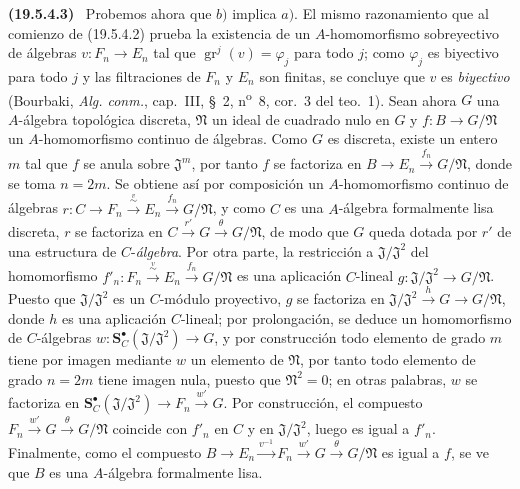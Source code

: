 \documentclass[10pt,oneside]{book}
\makeatletter
\newcommand{\gr}{\operatorname{gr}}
\newcommand{\setmanualcurrentlabel}[1]{\def\@currentlabel{#1}}
\newcommand{\oldpage}[2][]{%
  \setcounter{footnote}{0}%
  \marginpar{\scriptsize\textbf{#1}~|~#2}\ignorespaces}
\newenvironment{env}[1][]{\setmanualcurrentlabel{#1}\par\medskip\noindent\textbf{(#1)}\ }{\par}
\makeatother
\begin{document}
\begin{env}[19.5.4.3]
\label{0.19.5.4.3-es}
\oldpage[0\textsubscript{IV-1}]{93}
Probemos ahora que $b)$ implica $a)$. El mismo razonamiento que al comienzo de
(19.5.4.2) prueba la existencia de un $A$-homomorfismo sobreyectivo de álgebras
$v:F_n\to E_n$ tal que $\gr^j(v)=\varphi_j$ para todo $j$; como $\varphi_j$
es biyectivo para todo $j$ y las filtraciones de $F_n$ y $E_n$ son
finitas, se concluye que $v$ es \emph{biyectivo} (Bourbaki,
\emph{Alg. conm.}, cap.~III, §~2, n\textsuperscript{o}~8, cor.~3 del teo.~1).
Sean ahora $G$ una $A$-álgebra topológica discreta, $\mathfrak N$ un
ideal de cuadrado nulo en $G$ y $f:B\to G/\mathfrak N$ un $A$-homomorfismo
continuo de álgebras. Como $G$ es discreta, existe un entero $m$ tal que
$f$ se anula sobre $\mathfrak J^m$, por tanto $f$ se factoriza en
$B\to E_n\xrightarrow{f_n}G/\mathfrak N$, donde se toma $n=2m$. Se obtiene así por
composición un $A$-homomorfismo continuo de álgebras
$r:C\to F_n\xrightarrow{\overset{v}{\sim}}E_n\xrightarrow{f_n}G/\mathfrak N$, y como $C$
es una $A$-álgebra formalmente lisa discreta, $r$ se factoriza en
$C\xrightarrow{r'}G\xrightarrow{\theta}G/\mathfrak N$, de modo que $G$ queda dotada por $r'$ de una
estructura de $C$-\emph{álgebra}. Por otra parte, la restricción a
$\mathfrak J/\mathfrak J^2$ del homomorfismo
$f'_n:F_n\xrightarrow{\overset{v}{\sim}}E_n\xrightarrow{f_n}G/\mathfrak N$ es una aplicación
$C$-lineal $g:\mathfrak J/\mathfrak J^2\to G/\mathfrak N$. Puesto que
$\mathfrak J/\mathfrak J^2$ es un $C$-módulo proyectivo, $g$ se factoriza en
$\mathfrak J/\mathfrak J^2\xrightarrow{h}G\to G/\mathfrak N$, donde $h$ es una
aplicación $C$-lineal; por prolongación, se deduce un homomorfismo de
$C$-álgebras $w:\mathbf S_C^\bullet(\mathfrak J/\mathfrak J^2)\to G$, y por
construcción todo elemento de grado $m$ tiene por imagen mediante $w$ un elemento de
$\mathfrak N$, por tanto todo elemento de grado $n=2m$ tiene imagen nula, puesto que
$\mathfrak N^2=0$; en otras palabras, $w$ se factoriza en
$\mathbf S_C^\bullet(\mathfrak J/\mathfrak J^2)\to F_n\xrightarrow{w'}G$. Por
construcción, el compuesto $F_n\xrightarrow{w'}G\xrightarrow{\theta}G/\mathfrak N$
coincide con $f'_n$ en $C$ y en $\mathfrak J/\mathfrak J^2$, luego es
igual a $f'_n$. Finalmente, como el compuesto
$B\to E_n\xrightarrow{v^{-1}}F_n\xrightarrow{w'}G\xrightarrow{\theta}G/\mathfrak N$ es
igual a $f$, se ve que $B$ es una $A$-álgebra formalmente lisa.
\end{env}
\end{document}
